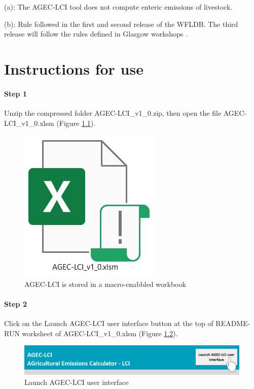 \documentclass[openany]{book}
\begin{document}
(a): The AGEC-LCI tool does not compute enteric emissions of livestock.

(b): Rule followed in the first and second release of the WFLDB. The third release will follow the rules defined in Glasgow workshops \citep{nemecek2014}.

\hypertarget{instructions}{%
\chapter{Instructions for use}\label{instructions}}

\hypertarget{step-1}{%
\subsubsection*{Step 1}\label{step-1}}

Unzip the compressed folder AGEC-LCI\_v1\_0.zip, then open the file AGEC-LCI\_v1\_0.xlsm (Figure \ref{fig:agec-icon}).

\begin{figure}[ht]

{\centering \includegraphics[width=0.15\linewidth]{Figures/agec_lci_icon} 

}

\caption{AGEC-LCI is stored in a macro-enabbled workbook}\label{fig:agec-icon}
\end{figure}

\hypertarget{step-2}{%
\subsubsection*{Step 2}\label{step-2}}

Click on the Launch AGEC-LCI user interface button at the top of README-RUN worksheet of AGEC-LCI\_v1\_0.xlsm (Figure \ref{fig:agec-lci-step1}).

\begin{figure}[ht]

{\centering \includegraphics[width=0.85\linewidth]{Figures/agec_lci_step1} 

}

\caption{Launch AGEC-LCI user interface}\label{fig:agec-lci-step1}
\end{figure}
\end{document}
